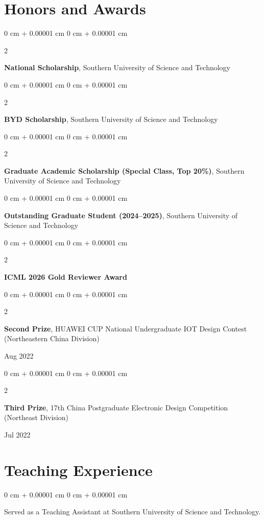 \documentclass[10pt, letterpaper]{article}
\newenvironment{onecolentry}{
    \begin{adjustwidth}{
        0 cm + 0.00001 cm
    }{
        0 cm + 0.00001 cm
    }
}{
    \end{adjustwidth}
} %
\newenvironment{twocolentry}[2][]{
    \onecolentry
    \def\secondColumn{#2}
    \setcolumnwidth{\fill, 4.5 cm}
    \begin{paracol}{2}
}{
    \switchcolumn \raggedleft \secondColumn
    \end{paracol}
    \endonecolentry
} %
\begin{document}
    \section{Honors and Awards}
        \begin{twocolentry}{2026}
            \textbf{National Scholarship}, Southern University of Science and Technology
        \end{twocolentry}

        \vspace{0.10 cm}
        \begin{twocolentry}{2026}
            \textbf{BYD Scholarship}, Southern University of Science and Technology
        \end{twocolentry}

        \vspace{0.10 cm}
        \begin{twocolentry}{2026}
            \textbf{Graduate Academic Scholarship (Special Class, Top 20\%)}, Southern University of Science and Technology
        \end{twocolentry}

        \vspace{0.10 cm}
        \begin{onecolentry}
            \textbf{Outstanding Graduate Student (2024--2025)}, Southern University of Science and Technology
        \end{onecolentry}

        \vspace{0.10 cm}
        \begin{twocolentry}{2026}
            \textbf{ICML 2026 Gold Reviewer Award}
        \end{twocolentry}

        \vspace{0.10 cm}
        \begin{twocolentry}{Aug 2022}
            \textbf{Second Prize}, HUAWEI CUP National Undergraduate IOT Design Contest (Northeastern China Division)
        \end{twocolentry}

        \vspace{0.10 cm}
        \begin{twocolentry}{Jul 2022}
            \textbf{Third Prize}, 17th China Postgraduate Electronic Design Competition (Northeast Division)
        \end{twocolentry}

    \section{Teaching Experience}
        \begin{onecolentry}
            Served as a Teaching Assistant at Southern University of Science and Technology.
        \end{onecolentry}
\end{document}

